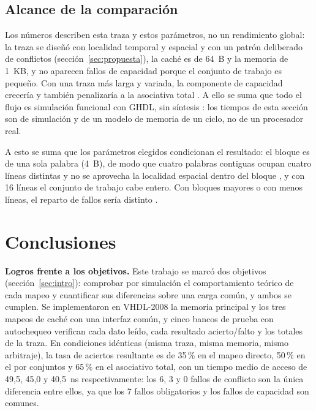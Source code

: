 \documentclass[llncs]{llncs}
\begin{document}
\subsection{Alcance de la comparación}

Los números describen esta traza y estos parámetros, no un rendimiento
global: la traza se diseñó con localidad temporal y espacial y con un
patrón deliberado de conflictos (sección~\ref{sec:propuesta}), la caché
es de 64~B y la memoria de 1~KB, y no aparecen fallos de capacidad
porque el conjunto de trabajo es pequeño. Con una traza más larga y
variada, la componente de capacidad crecería y también penalizaría a la
asociativa total \cite{bryant2015,patterson2017}. A ello se suma que
todo el flujo es simulación funcional con GHDL, sin síntesis
\cite{ghdl-docs}: los tiempos de esta sección son de simulación y de
un modelo de memoria de un ciclo, no de un procesador real.

A esto se suma que los parámetros elegidos condicionan el resultado: el
bloque es de una sola palabra (4~B), de modo que cuatro palabras
contiguas ocupan cuatro líneas distintas y no se aprovecha la localidad
espacial dentro del bloque \cite{bryant2015,wikipedia-locality}, y con
16 líneas el conjunto de trabajo cabe entero. Con bloques mayores o con
menos líneas, el reparto de fallos sería distinto
\cite{bryant2015,patterson2017}.

\section{Conclusiones}
\label{sec:conclusiones}

\textbf{Logros frente a los objetivos.} Este trabajo se marcó dos
objetivos (sección~\ref{sec:intro}): comprobar por simulación el
comportamiento teórico de cada mapeo y cuantificar sus diferencias
sobre una carga común, y ambos se cumplen. Se implementaron en
VHDL-2008 la memoria principal y
los tres mapeos de caché con una interfaz común, y cinco bancos de
prueba con autochequeo verifican cada dato leído, cada resultado
acierto/falto y los totales de la traza. En condiciones idénticas
(misma traza, misma memoria, mismo arbitraje), la tasa de aciertos
resultante es de 35\,\% en el mapeo directo, 50\,\% en el por conjuntos
y 65\,\% en el asociativo total, con un tiempo medio de acceso de 49,5,
45,0 y 40,5~ns respectivamente: los 6, 3 y 0 fallos de conflicto son la
única diferencia entre ellos, ya que los 7 fallos obligatorios y los
fallos de capacidad son comunes.
\end{document}
